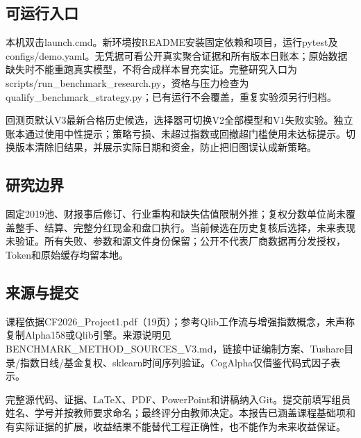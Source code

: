 \documentclass[UTF8,a4paper,10pt]{ctexart}
\begin{document}
\subsection*{可运行入口}
本机双击launch.cmd。新环境按README安装固定依赖和项目，运行pytest及configs/demo.yaml。无凭据可看公开真实聚合证据和所有版本日账本；原始数据缺失时不能重跑真实模型，不将合成样本冒充实证。完整研究入口为scripts/run\_benchmark\_research.py，资格与压力检查为qualify\_benchmark\_strategy.py；已有运行不会覆盖，重复实验须另行归档。

回测页默认V3最新合格历史候选，选择器可切换V2全部模型和V1失败实验。独立账本通过使用中性提示；策略亏损、未超过指数或回撤超门槛使用未达标提示。切换版本清除旧结果，并展示实际日期和资金，防止把旧图误认成新策略。
\subsection*{研究边界}
固定2019池、财报事后修订、行业重构和缺失估值限制外推；复权分数单位尚未覆盖整手、结算、完整分红现金和盘口执行。当前候选在历史复核后选择，未来表现未验证。所有失败、参数和源文件身份保留；公开不代表厂商数据再分发授权，Token和原始缓存均留本地。
\subsection*{来源与提交}
课程依据CF2026\_Project1.pdf（19页）；参考Qlib工作流与增强指数概念，未声称复制Alpha158或Qlib引擎。来源说明见BENCHMARK\_METHOD\_SOURCES\_V3.md，链接中证编制方案、Tushare目录/指数日线/基金复权、sklearn时间序列验证。CogAlpha仅借鉴代码式因子表示。

完整源代码、证据、LaTeX、PDF、PowerPoint和讲稿纳入Git。提交前填写组员姓名、学号并按教师要求命名；最终评分由教师决定。本报告已涵盖课程基础项和有实际证据的扩展，收益结果不能替代工程正确性，也不能作为未来收益保证。
\end{document}
